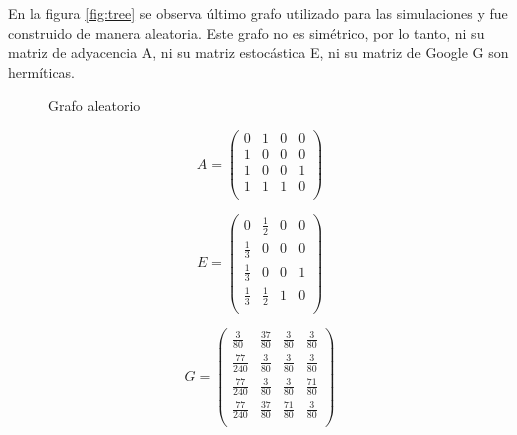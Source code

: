 En la figura \ref{fig:tree} se observa último grafo utilizado para las simulaciones y fue construido de manera aleatoria. Este grafo no es simétrico, por lo tanto, ni su matriz de adyacencia A, ni su matriz estocástica E, ni su matriz de Google G son hermíticas.

\begin{figure}[H]
    \centering
    \caption[Grafo aleatorio]{Grafo aleatorio}
    \label{fig:any}
\end{figure}

\begin{equation}
    A =
    \begin{pmatrix}
        0 & 1 & 0 & 0 \\
        1 & 0 & 0 & 0 \\
        1 & 0 & 0 & 1 \\
        1 & 1 & 1 & 0 \\
    \end{pmatrix}
\end{equation}

\begin{equation}
    E =
    \begin{pmatrix}
        0 & \frac{1}{2} & 0 & 0 \\
        \frac{1}{3} & 0 & 0 & 0 \\
        \frac{1}{3} & 0 & 0 & 1 \\
        \frac{1}{3} & \frac{1}{2} & 1 & 0 \\
    \end{pmatrix}
\end{equation}

\begin{equation}
    G =
    \begin{pmatrix}
        \frac{3}{80} & \frac{37}{80} & \frac{3}{80} & \frac{3}{80} \\
        \frac{77}{240} & \frac{3}{80} & \frac{3}{80} & \frac{3}{80} \\
        \frac{77}{240} & \frac{3}{80} & \frac{3}{80} & \frac{71}{80} \\
        \frac{77}{240} & \frac{37}{80} & \frac{71}{80} & \frac{3}{80} \\
    \end{pmatrix}
\end{equation}


